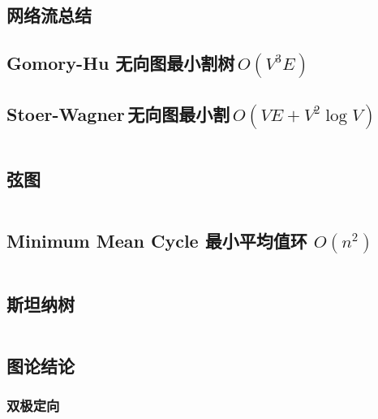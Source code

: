 \subsection{网络流总结}
				
				\subsection{Gomory-Hu 无向图最小割树\,$O(V ^ 3 E)$}
					
				\subsection{Stoer-Wagner\,无向图最小割\,$O(VE + V ^ 2 \log V)$}
					\inputminted{cpp}{src/yzh/Stoer-Wagner.cpp}
				\subsection{弦图}
					
					\inputminted{cpp}{src/TreeandGraph/弦图.cpp}
				\subsection{Minimum Mean Cycle 最小平均值环 $O(n^2)$}
					\inputminted{cpp}{src/TreeandGraph/MeanCycle.cpp}
				\subsection{斯坦纳树}
					\inputminted{cpp}{src/TreeandGraph/斯坦纳树.cpp}
				\subsection{图论结论}
					
					
					
					
					
					
					\subsubsection{双极定向}
					\inputminted{cpp}{src/tbr/bipolar_orientation.cpp}
					
